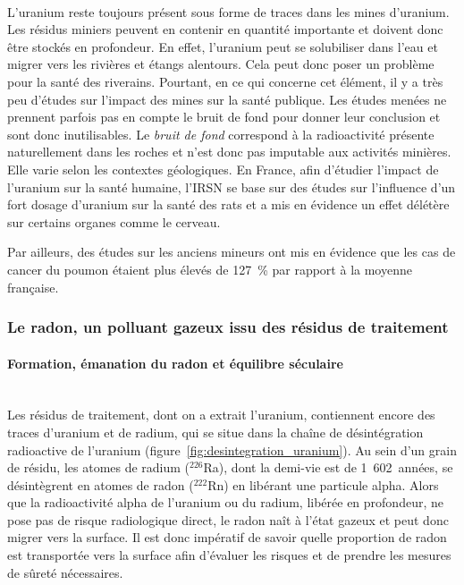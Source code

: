 \documentclass{article}
\begin{document}
\paragraph{} L'uranium reste toujours présent sous forme de traces dans les mines d'uranium. Les résidus miniers peuvent en contenir en quantité importante et doivent donc être stockés en profondeur. En effet, l'uranium peut se solubiliser dans l'eau et migrer vers les rivières et étangs alentours. Cela peut donc poser un problème pour la santé des riverains. Pourtant, en ce qui concerne cet élément, il y a très peu d'études sur l’impact des mines sur la santé publique. Les études menées ne prennent parfois pas en compte le bruit de fond pour donner leur conclusion et sont donc inutilisables. Le \emph{bruit de fond} correspond à la radioactivité présente naturellement dans les roches et n'est donc pas imputable aux activités minières. Elle varie selon les contextes géologiques. En France, afin d’étudier l’impact de l’uranium sur la santé humaine, l’IRSN se base sur des études sur l’influence d’un fort dosage d’uranium sur la santé des rats et a mis en évidence un effet délétère sur certains organes comme le cerveau.

Par ailleurs, des études sur les anciens mineurs ont mis en évidence que les cas de cancer du poumon étaient plus élevés de 127~\% par rapport à la moyenne française.


\subsubsection{Le radon, un polluant gazeux issu des résidus de traitement}

\paragraph{Formation, émanation du radon et équilibre séculaire \\ \\} Les résidus de traitement, dont on a extrait l’uranium, contiennent encore des traces d’uranium et de radium, qui se situe dans la chaîne de désintégration radioactive de l’uranium (figure~\ref{fig:desintegration_uranium}). Au sein d’un grain de résidu, les atomes de radium ($^{226}$Ra), dont la demi-vie est de 1~602~années, se désintègrent en atomes de radon ($^{222}$Rn) en libérant une particule alpha. Alors que la radioactivité alpha de l’uranium ou du radium, libérée en profondeur, ne pose pas de risque radiologique direct, le radon naît à l’état gazeux et peut donc migrer vers la surface. Il est donc impératif de savoir quelle proportion de radon est transportée vers la surface afin d'évaluer les risques et de prendre les mesures de sûreté nécessaires.
\end{document}

